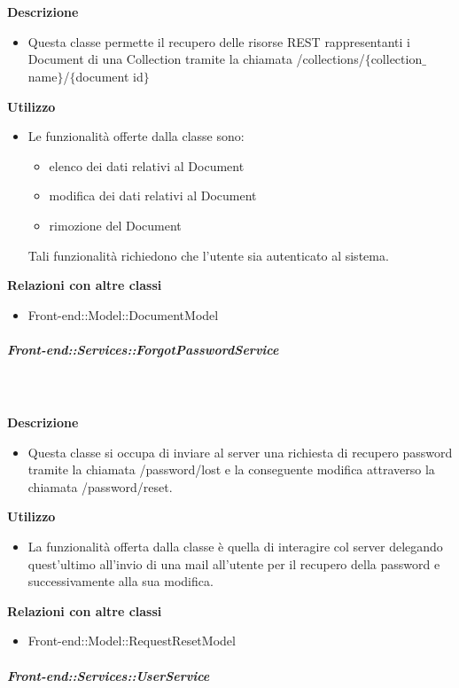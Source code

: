         \textbf{\\ \\ Descrizione} 
          \begin{itemize}
            \item[] Questa classe permette il recupero delle risorse REST rappresentanti i Document di una Collection tramite la chiamata /collections/$\{$collection$\_$name$\}$/$\{$document id$\}$
          \end{itemize}      
        \textbf{Utilizzo}  
          \begin{itemize}
            \item[] Le funzionalità offerte dalla classe sono: 
\begin{itemize} 
\item elenco dei dati relativi al Document 
\item modifica dei dati relativi al Document
\item rimozione del Document 
\end{itemize} 
Tali funzionalità richiedono che l'utente sia autenticato al sistema.
          \end{itemize}
          \textbf{Relazioni con altre classi}
          \begin{itemize}
              \item{Front-end::Model::DocumentModel}
          \end{itemize}
      \subparagraph{Front-end::Services::ForgotPasswordService}
        
        \textbf{\\ \\ Descrizione} 
          \begin{itemize}
            \item[] Questa classe si occupa di inviare al server una richiesta di recupero password tramite la chiamata /password/lost e la conseguente modifica attraverso la chiamata /password/reset.
          \end{itemize}      
        \textbf{Utilizzo}  
          \begin{itemize}
            \item[] La  funzionalità offerta dalla classe è quella di interagire col server delegando quest'ultimo all'invio di una mail all'utente per il recupero della password e successivamente alla sua modifica.
          \end{itemize}
          \textbf{Relazioni con altre classi}
          \begin{itemize}
              \item{Front-end::Model::RequestResetModel}
          \end{itemize}
      \subparagraph{Front-end::Services::UserService}
        
